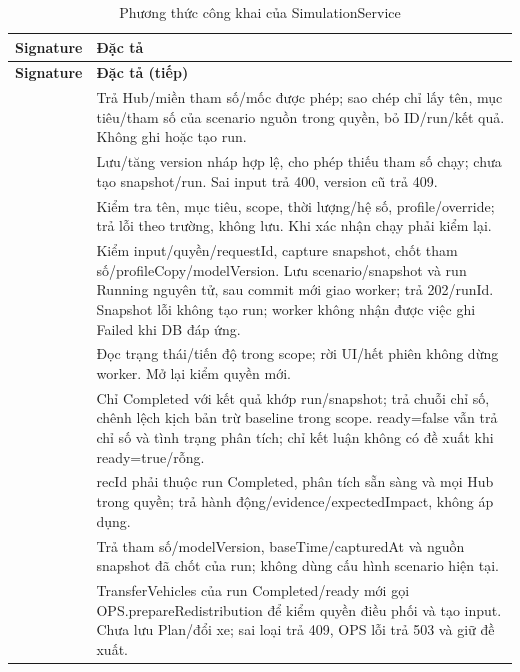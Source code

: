 \begin{longtable}{|L{58mm}|L{81mm}|}
\caption{Phương thức công khai của SimulationService}\\\hline
\textbf{Signature} & \textbf{Đặc tả}\\\hline
\endfirsthead
\hline\textbf{Signature} & \textbf{Đặc tả (tiếp)}\\\hline\endhead
{} &
Trả Hub/miền tham số/mốc được phép; sao chép chỉ lấy tên, mục tiêu/tham số của scenario nguồn trong quyền, bỏ ID/run/kết quả. Không ghi hoặc tạo run.\\\hline
{} &
Lưu/tăng version nháp hợp lệ, cho phép thiếu tham số chạy; chưa tạo snapshot/run. Sai input trả 400, version cũ trả 409.\\\hline
{} &
Kiểm tra tên, mục tiêu, scope, thời lượng/hệ số, profile/override; trả lỗi theo trường, không lưu. Khi xác nhận chạy phải kiểm lại.\\\hline
{} &
Kiểm input/quyền/requestId, capture snapshot, chốt tham số/profileCopy/modelVersion. Lưu scenario/snapshot và run Running nguyên tử, sau commit mới giao worker; trả 202/runId. Snapshot lỗi không tạo run; worker không nhận được việc ghi Failed khi DB đáp ứng.\\\hline
{} &
Đọc trạng thái/tiến độ trong scope; rời UI/hết phiên không dừng worker. Mở lại kiểm quyền mới.\\\hline
{} &
Chỉ Completed với kết quả khớp run/snapshot; trả chuỗi chỉ số, chênh lệch kịch bản trừ baseline trong scope. ready=false vẫn trả chỉ số và tình trạng phân tích; chỉ kết luận không có đề xuất khi ready=true/rỗng.\\\hline
{} &
recId phải thuộc run Completed, phân tích sẵn sàng và mọi Hub trong quyền; trả hành động/evidence/expectedImpact, không áp dụng.\\\hline
{} &
Trả tham số/modelVersion, baseTime/capturedAt và nguồn snapshot đã chốt của run; không dùng cấu hình scenario hiện tại.\\\hline
{} &
TransferVehicles của run Completed/ready mới gọi OPS.prepareRedistribution để kiểm quyền điều phối và tạo input. Chưa lưu Plan/đổi xe; sai loại trả 409, OPS lỗi trả 503 và giữ đề xuất.\\\hline
\end{longtable}

